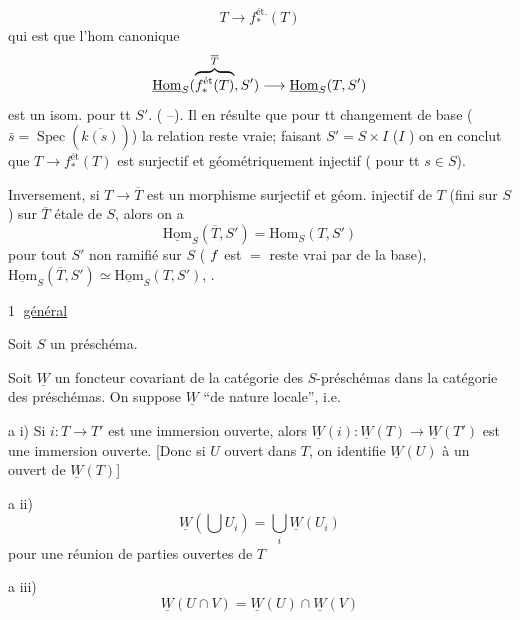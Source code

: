 \[
T\longrightarrow f_*^{\text{ét}.}(T)
\]
qui est  que l'hom canonique
\[
\underline{\mathrm{Hom}}_S(\overbrace{f_*^{\text{ét}}(T)}^{\overline T},S')\longrightarrow
\underline{\mathrm{Hom}}_S(T,S')
\]
est un isom. pour tt $S'$. ( --). Il en résulte que pour tt  changement de base
( $\bar s=\operatorname{Spec}(\overline{k(s)})$)
la  relation reste vraie; faisant $S'=S\times I$ ($I$ ) on en conclut que
$T\to f_*^{\text{ét}}(T)$ est surjectif et  géométriquement injectif
(    pour tt $s\in S$).

Inversement, si $T\to\overline T$ est un morphisme surjectif et géom. injectif de $T$ (fini  sur $S$) sur $\overline T$  étale de $S$, alors on a
\[
\underline{\mathrm{Hom}}_S(\overline T,S')=\mathrm{Hom}_S(T,S')
\]
pour tout $S'$ non ramifié sur $S$ ( $f$ est   $=$  reste vrai par  de la base),
 
$\underline{\mathrm{Hom}}_S(\overline T,S')\simeq\underline{\mathrm{Hom}}_S(T,S')$,
 .

\textcircled{1}
\uline{ général}

Soit $S$ un préschéma. 

Soit $\underline W$ un foncteur covariant de la catégorie des $S$-préschémas dans la catégorie des  préschémas. On suppose $\underline W$ ``de nature locale'', i.e.

a i) Si $i:T\to T'$ est une immersion ouverte, alors $\underline W(i):\underline W(T)\to\underline W(T')$ est une immersion ouverte.
[Donc si $U$ ouvert dans $T$, on identifie $\underline W(U)$ à un ouvert de $\underline W(T)$]


a ii)
\[
\underline W(\bigcup U_i)=\bigcup_i\underline W(U_i)
\]
pour une réunion  de parties ouvertes de $T$

a iii)
\[
\underline W(U\cap V)=\underline W(U)\cap\underline W(V)
\]


